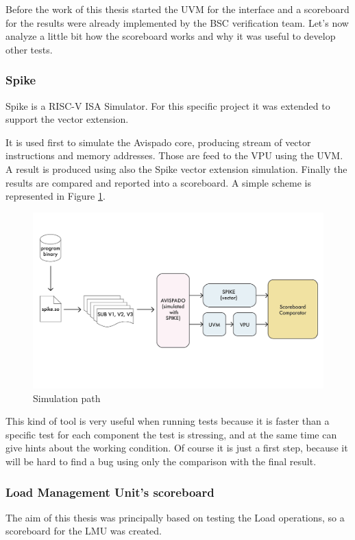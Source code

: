 Before the work of this thesis started the UVM for the interface and a scoreboard for the results were already implemented by the BSC verification team. Let's now analyze a little bit how the scoreboard works and why it was useful to develop other tests.

\subsubsection{Spike}
Spike is a RISC-V ISA Simulator. For this specific project it was extended to support the vector extension.

It is used first to simulate the Avispado core, producing stream of vector instructions and memory addresses. Those are feed to the VPU using the UVM. A result is produced using also the Spike vector extension simulation. Finally the results are compared and reported into a scoreboard. A simple scheme is represented in Figure \ref{bin-to-log}.

\begin{figure}[H]
    \centering
    \includegraphics[scale = 0.6]{Chapter_2/img/bin-to-log.png}
    \caption{Simulation path}
    \label{bin-to-log}
\end{figure}

This kind of tool is very useful when running tests because it is faster than a specific test for each component the test is stressing, and at the same time can give hints about the working condition. Of course it is just a first step, because it will be hard to find a bug using only the comparison with the final result.

\subsubsection{Load Management Unit's scoreboard}
The aim of this thesis was principally based on testing the Load operations, so a scoreboard for the LMU was created.


